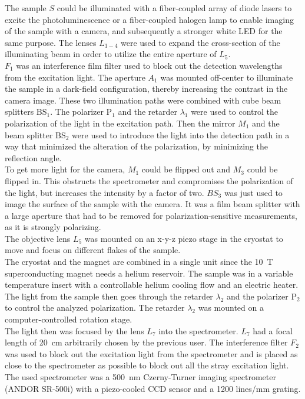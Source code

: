 \documentclass[
	twoside,
	parskip=half,
	a4paper,
]{scrbook}
\begin{document}
The sample $S$ could be illuminated with a fiber-coupled array of diode lasers to excite the photoluminescence or a fiber-coupled halogen lamp to enable imaging of the sample with a camera, and subsequently a stronger white LED for the same purpose.
The lenses $L_{1-4}$ were used to expand the cross-section of the illuminating beam in order to utilize the entire aperture of $L_5$.\\
$F_1$ was an interference film filter used to block out the detection wavelengths from the excitation light.
The aperture $A_1$ was mounted off-center to illuminate the sample in a dark-field configuration, thereby increasing the contrast in the camera image.
These two illumination paths were combined with cube beam splitters BS$_1$.
The polarizer P$_1$ and the retarder $\lambda_1$ were used to control the polarization of the light in the excitation path.
Then the mirror $M_1$ and the beam splitter BS$_2$ were used to introduce the light into the detection path in a way that minimized the alteration of the polarization, by minimizing the reflection angle.\\
To get more light for the camera, $M_1$ could be flipped out and $M_3$ could be flipped in.
This obstructs the spectrometer and compromises the polarization of the light, but increases the intensity by a factor of two.
$BS_3$ was just used to image the surface of the sample with the camera. 
It was a film beam splitter with a large aperture that had to be removed for polarization-sensitive measurements, as it is strongly polarizing.\\
The objective lens $L_5$ was mounted on an x-y-z piezo stage in the cryostat to move and focus on different flakes of the sample.\\
The cryostat and the magnet are combined in a single unit since the \SI{10}{T} superconducting magnet needs a helium reservoir.
The sample was in a variable temperature insert with a controllable helium cooling flow and an electric heater.\\
The light from the sample then goes through the retarder $\lambda_2$ and the polarizer P$_2$ to control the analyzed polarization.
The retarder $\lambda_2$ was mounted on a computer-controlled rotation stage.\\
The light then was focused by the lens $L_7$ into the spectrometer.
$L_7$ had a focal length of \SI{20}{cm} arbitrarily chosen by the previous user.
The interference filter $F_2$ was used to block out the excitation light from the spectrometer and is placed as close to the spectrometer as possible to block out all the stray excitation light.\\
The used spectrometer was a \SI{500}{nm} Czerny-Turner imaging spectrometer (ANDOR SR-500i) with a piezo-cooled CCD sensor and a 1200 lines/mm grating.
\end{document}
